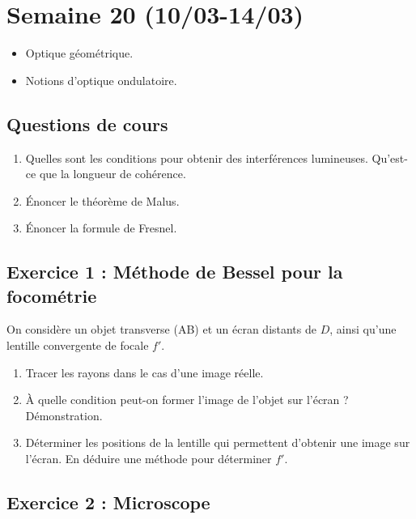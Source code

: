 \section{Semaine 20 (10/03-14/03) }

\begin{itemize}
	\item Optique géométrique.
	\item Notions d'optique ondulatoire.
\end{itemize}

\subsection{Questions de cours}

\begin{enumerate}
	\item Quelles sont les conditions pour obtenir des interférences lumineuses. Qu'est-ce que la longueur de cohérence.
	\item Énoncer le théorème de Malus.
	\item Énoncer la formule de Fresnel.
\end{enumerate}

\subsection{Exercice 1 : Méthode de Bessel pour la focométrie}

On considère un objet transverse (AB) et un écran distants de $D$, ainsi qu'une lentille convergente de focale $f'$.

\begin{enumerate}
	\item Tracer les rayons dans le cas d'une image réelle.
	\item À quelle condition peut-on former l'image de l'objet sur l'écran ? Démonstration.
	\item Déterminer les positions de la lentille qui permettent d'obtenir une image sur l'écran. En déduire une méthode pour déterminer $f'$.
\end{enumerate}

\subsection{Exercice 2 : Microscope}

